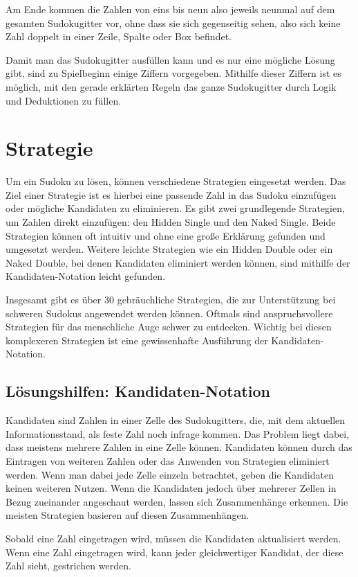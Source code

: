 Am Ende kommen die Zahlen von eins bis neun also jeweils neunmal auf dem gesamten Sudokugitter vor, ohne dass sie sich gegenseitig sehen, also sich keine Zahl doppelt in einer Zeile, Spalte oder Box befindet.

Damit man das Sudokugitter ausfüllen kann und es nur eine mögliche Lösung gibt, sind zu Spielbeginn einige Ziffern vorgegeben. Mithilfe dieser Ziffern ist es möglich, mit den gerade erklärten Regeln das ganze Sudokugitter durch Logik und Deduktionen zu füllen. \cite{sudopedia_2022}

\section{Strategie}
Um ein Sudoku zu lösen, können verschiedene Strategien eingesetzt werden. Das Ziel einer Strategie ist es hierbei eine passende Zahl in das Sudoku einzufügen oder mögliche Kandidaten zu eliminieren. Es gibt zwei grundlegende Strategien, um Zahlen direkt einzufügen: den Hidden Single und den Naked Single. Beide Strategien können oft intuitiv und ohne eine große Erklärung gefunden und umgesetzt werden. Weitere leichte Strategien wie ein Hidden Double oder ein Naked Double, bei denen Kandidaten eliminiert werden können, sind mithilfe der Kandidaten-Notation leicht gefunden.

Insgesamt gibt es über 30 gebräuchliche Strategien, die zur Unterstützung bei schweren Sudokus angewendet werden können. Oftmals sind anspruchsvollere Strategien für das menschliche Auge schwer zu entdecken. Wichtig bei diesen komplexeren Strategien ist eine gewissenhafte Ausführung der Kandidaten-Notation.\cite{martin}

\subsection{Lösungshilfen: Kandidaten-Notation}
Kandidaten sind Zahlen in einer Zelle des Sudokugitters, die, mit dem aktuellen Informationsstand, als feste Zahl noch infrage kommen. Das Problem liegt dabei, dass meistens mehrere Zahlen in eine Zelle können. Kandidaten können durch das Eintragen von weiteren Zahlen oder das Anwenden von Strategien eliminiert werden. Wenn man dabei jede Zelle einzeln betrachtet, geben die Kandidaten keinen weiteren Nutzen. Wenn die Kandidaten jedoch über mehrerer Zellen in Bezug zueinander angeschaut werden, lassen sich Zusammenhänge erkennen. Die meisten Strategien basieren auf diesen Zusammenhängen. 

Sobald eine Zahl eingetragen wird, müssen die Kandidaten aktualisiert werden. Wenn eine Zahl eingetragen wird, kann jeder gleichwertiger Kandidat, der diese Zahl sieht, gestrichen werden.
